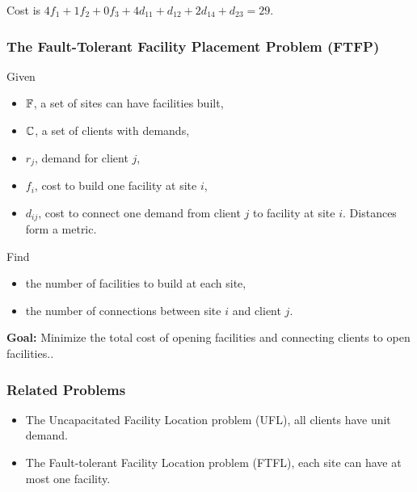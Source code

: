 \documentclass[handout, hyperref, xcolor=dvipsnames]{beamer}
\begin{document}
\begin{frame}
\begin{minipage}{.4\linewidth}
  \end{minipage}
  \vspace{.1in}

  Cost is $4f_1 + 1f_2 + 0f_3 + 4d_{11} + d_{12} + 2d_{14} +
  d_{23} = 29$.
\end{frame}
\begin{frame}
  \frametitle{The Fault-Tolerant Facility Placement Problem (FTFP)}
  Given
  \begin{itemize}
  \item $\mathbb{F}$, a set of sites can have facilities built,
  \item $\mathbb{C}$, a set of clients with demands,
  \item $r_j$, demand for client $j$,
  \item $f_i$, cost to build one facility at site $i$,
  \item $d_{ij}$, cost to connect one demand from client $j$ to
    facility at site $i$. Distances form a metric.
  \end{itemize}
  Find 
  \begin{itemize}
  \item the number of facilities to build at each site,
  \item the number of connections between site $i$ and client
    $j$.
  \end{itemize}

  \textbf{Goal:} Minimize the total cost of opening
  facilities and connecting clients to open facilities..
\end{frame}

\begin{frame}
  \frametitle{Related Problems}
  \begin{itemize}
  \item The Uncapacitated Facility Location problem (UFL),
    all clients have unit demand.
  \item The Fault-tolerant Facility Location problem (FTFL),
    each site can have at most one facility.
  \end{itemize}
\end{frame}
\end{document}
